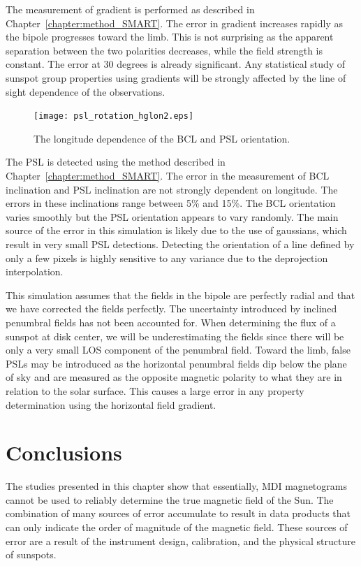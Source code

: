 The measurement of gradient is performed as described in Chapter~\ref{chapter:method_SMART}. The error in gradient increases rapidly as the bipole progresses toward the limb. This is not surprising as the apparent separation between the two polarities decreases, while the field strength is constant. The error at 30 degrees is already significant. Any statistical study of sunspot group properties using gradients will be strongly affected by the line of sight dependence of the observations.

\begin{figure}[!ht]
\begin{center}
\texttt{[image: psl\_rotation\_hglon2.eps]}
\end{center}
\caption{The longitude dependence of the BCL and PSL orientation.}\label{fig:bipolerotation}
\end{figure}

The \gls{PSL} is detected using the method described in Chapter~\ref{chapter:method_SMART}. The error in the measurement of \gls{BCL} inclination and \gls{PSL} inclination are not strongly dependent on longitude. The errors in these inclinations range between 5\% and 15\%. The \gls{BCL} orientation varies smoothly but the \gls{PSL} orientation appears to vary randomly. The main source of the error in this simulation is likely due to the use of gaussians, which result in very small \gls{PSL} detections. Detecting the orientation of a line defined by only a few pixels is highly sensitive to any variance due to the deprojection interpolation.

This simulation assumes that the fields in the bipole are perfectly radial and that we have corrected the fields perfectly. The uncertainty introduced by inclined penumbral fields has not been accounted for. When determining the flux of a sunspot at disk center, we will be underestimating the fields since there will be only a very small \gls{LOS} component of the penumbral field. Toward the limb, false \glspl{PSL} may be introduced as the horizontal penumbral fields dip below the plane of sky and are measured as the opposite magnetic polarity to what they are in relation to the solar surface. This causes a large error in any property determination using the horizontal field gradient.

\section{Conclusions}

The studies presented in this chapter show that essentially, \gls{MDI} magnetograms cannot be used to reliably determine the true magnetic field of the Sun. The combination of many sources of error accumulate to result in data products that can only indicate the order of magnitude of the magnetic field. These sources of error are a result of the instrument design, calibration, and the physical structure of sunspots. 

